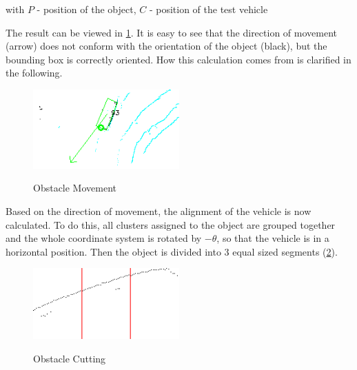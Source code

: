\documentclass[11pt,oneside,openright]{mpreport}
\begin{document}
with $P$ - position of the object, $C$ - position of the test vehicle


The result can be viewed in \cref{obst_rot}. It is easy to see that the direction of movement (arrow) does not conform with the orientation of the object (black), 
but the bounding box is correctly oriented. How this calculation comes from is clarified in the following.

\begin{figure}[!ht]
\begin{center}
\caption{Obstacle Movement}
\includegraphics[width=0.5\textwidth]{bilder/obst_rot.png}
\label{obst_rot}
\end{center}
\end{figure}


Based on the direction of movement, the alignment of the vehicle is now calculated. To do this, all clusters assigned to the object are grouped together and 
the whole coordinate system is rotated by $-\theta$, so that the vehicle is in a horizontal position.
Then the object is divided into 3 equal sized segments (\cref{obst_devide}).

\begin{figure}[!ht]
\begin{center}
\caption{Obstacle Cutting}
\includegraphics[width=0.5\textwidth]{bilder/obst_devide.png}
\label{obst_devide}
\end{center}
\end{figure}
\end{document}
